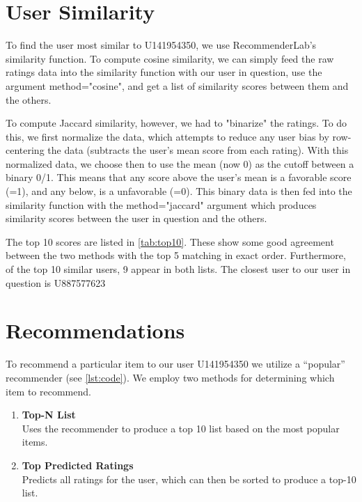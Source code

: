 \section{User Similarity}
To find the user most similar to \textsf{U141954350}, we use RecommenderLab's similarity function.  To compute cosine similarity, we can simply feed the raw ratings data into the similarity function with our user in question, use the argument \textsf{method="cosine"}, and get a list of similarity scores between them and the others.

To compute Jaccard similarity, however, we had to "binarize" the ratings.  To do this, we first normalize the data, which attempts to reduce any user bias by row-centering the data (subtracts the user's mean score from each rating).  With this normalized data, we choose then to use the mean (now 0) as the cutoff between a binary 0/1.  This means that any score above the user's mean is a favorable score (\textsf{=1}), and any below, is a unfavorable (\textsf{=0}).  This binary data is then fed into the similarity function with the \textsf{method="jaccard"} argument which produces similarity scores between the user in question and the others.


The top 10 scores are listed in \cref{tab:top10}.  These show some good agreement between the two methods with the top 5 matching in exact order.  Furthermore, of the top 10 similar users, 9 appear in both lists.  The closest user to our user in question is \textsf{U887577623}



\section{Recommendations}

To recommend a particular item to our user \textsf{U141954350} we utilize a ``popular'' recommender (see \vref{lst:code}).  We employ two methods for determining which item to recommend.
\begin{enumerate}
\item \textbf{Top-N List}\\Uses the recommender to produce a top 10 list based on the most popular items.
\item \textbf{Top Predicted Ratings}\\Predicts all ratings for the user, which can then be sorted to produce a top-10 list.
\end{enumerate}

